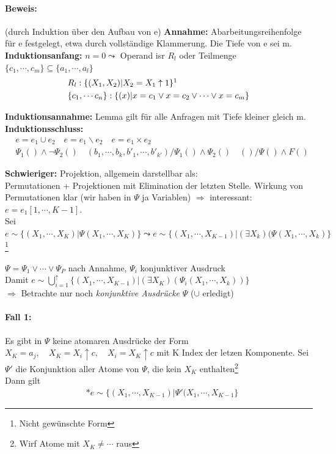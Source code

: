 \documentclass[12pt, a4paper]{article}
\begin{document}
\paragraph*{Beweis:} (durch Induktion über den Aufbau von e)
\textbf{Annahme:} Abarbeitungsreihenfolge für e festgelegt, etwa durch vollständige Klammerung. Die Tiefe von e sei m. \\
\textbf{Induktionsanfang:} $n = 0 \leadsto $ Operand isr $R_l$ oder Teilmenge $\{ c_1, \cdots, c_m \} \subseteq \{ a_1, \cdots, a_l \}$
\begin{align*}
&R_l: \{ (X_1, X_2) | X_2 = X_1 \uparrow 1 \}\footnotemark \\
&\{c_1, \cdots c_n \} : \{ (x) | x = c_1 \vee x = c_2 \vee \cdots \vee x = c_m \}
\end{align*}

\textbf{Induktionsannahme:} Lemma gilt für alle Anfragen mit Tiefe kleiner gleich m.
\textbf{Induktionsschluss:} 
\begin{align*}
& e = e_1 \cup e_2 \quad e = e_1 \backslash e_2 \quad e = e_1 \times e_2 \\
& \Psi_1() \wedge \lnot \Psi_2() \quad (b_1, \cdots, b_k, b'_1, \cdots, b'_{k'}) / \Psi_1() \wedge \Psi_2() \quad ()/\Psi() \wedge F()
\end{align*}

\textbf{Schwieriger:} Projektion, allgemein darstellbar als: \\
Permutationen + Projektionen mit Elimination der letzten Stelle. Wirkung von Permutationen klar (wir haben in $\Psi$ ja Variablen) $\Rightarrow$ interessant: $e = e_1[1, \cdots, K-1]$. \\
Sei $e \sim \{ (X_1, \cdots, X_K) | \Psi(X_1, \cdots, X_K) \} \leadsto e \sim \{(X_1, \cdots, X_{K-1}) | (\exists X_k) (\Psi(X_1, \cdots, X_k) \}$\footnote{Nicht gewünschte Form}

$\Psi = \Psi_1 \vee \cdots \vee \Psi_P$ nach Annahme, $\Psi_i$ konjunktiver Ausdruck \\
Damit $e \sim \bigcup^{\uparrow}_{i = 1} \{ (X_1, \cdots, X_{K - 1}) | (\exists X_K)(\Psi_i(X_1, \cdots, X_k)) \}$ \\
$\Rightarrow$ Betrachte nur noch \textit{konjunktive Ausdrücke} $\Psi$ ($\cup$ erledigt) \\

\paragraph{Fall 1:} Es gibt in $\Psi$ keine atomaren Ausdrücke der Form
$X_K = a_j, \quad X_K = X_i \uparrow c, \quad X_i = X_K \uparrow c$ mit K Index der letzen Komponente.
Sei $\Psi'$ die Konjunktion aller Atome von $\Psi$, die kein $X_K$ enthalten\footnote{Wirf Atome mit $X_K \neq \cdots$ raus} \\
Dann gilt
\begin{align*}
&* e \sim \{ (X_1, \cdots, X_{K - 1}) | \Psi'(X_1, \cdots, X_{K - 1} \} 
\end{align*}
\end{document}
